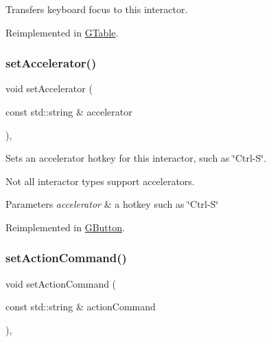 Transfers keyboard focus to this interactor. 



Reimplemented in \mbox{\hyperlink{classGTable_a49b39e0eeaf5af829e8956e9055c5cdc}{G\+Table}}.

\mbox{\label{classGInteractor_ad15f102f62e2960576012f1aa0ba4b2e}} 
\subsubsection{\texorpdfstring{set\+Accelerator()}{setAccelerator()}}
{\footnotesize\ttfamily void set\+Accelerator (\begin{DoxyParamCaption}\item[{const std\+::string \&}]{accelerator }\end{DoxyParamCaption})\hspace{0.3cm}{\ttfamily [virtual]}, {\ttfamily [inherited]}}



Sets an accelerator hotkey for this interactor, such as \char`\"{}\+Ctrl-\/\+S\char`\"{}. 

Not all interactor types support accelerators. 
\begin{DoxyParams}{Parameters}
{\em accelerator} & a hotkey such as \char`\"{}\+Ctrl-\/\+S\char`\"{} \\
\hline
\end{DoxyParams}


Reimplemented in \mbox{\hyperlink{classGButton_a5f78fc506a33b57dced42a419be34446}{G\+Button}}.

\mbox{\label{classGInteractor_a4b5843fe3030e038a1ba54cc03389bcf}} 
\subsubsection{\texorpdfstring{set\+Action\+Command()}{setActionCommand()}}
{\footnotesize\ttfamily void set\+Action\+Command (\begin{DoxyParamCaption}\item[{const std\+::string \&}]{action\+Command }\end{DoxyParamCaption})\hspace{0.3cm}{\ttfamily [virtual]}, {\ttfamily [inherited]}}




